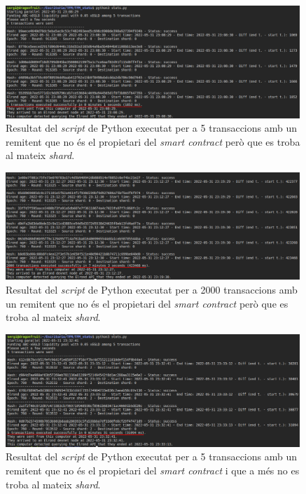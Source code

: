\documentclass[11pt,a4paper]{article}
\begin{document}
\begin{figure}[h]
\includegraphics[width=0.99\textwidth]{send5transnotowner.png}
\centering
\caption{Resultat del \textit{script} de Python executat per a 5 transaccions amb un remitent que no és el propietari del \textit{smart contract} però que es troba al mateix \textit{shard}.}\label{fig:send5transnotowner}
\end{figure} 

\begin{figure}[h]
\includegraphics[width=0.99\textwidth]{send2000transnotowner.png}
\centering
\caption{Resultat del \textit{script} de Python executat per a 2000 transaccions amb un remitent que no és el propietari del \textit{smart contract} però que es troba al mateix \textit{shard}.}\label{fig:send2000transnotowner}
\end{figure} 

\begin{figure}[h]
\includegraphics[width=0.99\textwidth]{send5transnotownerothershards.png}
\centering
\caption{Resultat del \textit{script} de Python executat per a 5 transaccions amb un remitent que no és el propietari del \textit{smart contract} i que a més no es troba al mateix \textit{shard}.}\label{fig:send5transnotownerothershards}
\end{figure} 
\end{document}
